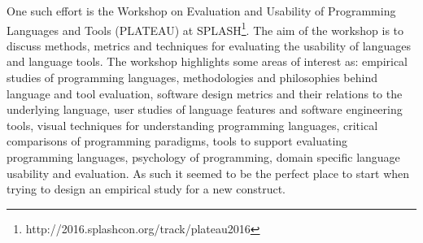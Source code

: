 One such effort is the Workshop on Evaluation and Usability of Programming Languages and Tools (PLATEAU) at SPLASH\footnote{http://2016.splashcon.org/track/plateau2016}. The aim of the workshop is to discuss methods, metrics and techniques for evaluating the usability of languages and language tools. The workshop highlights some areas of interest as: empirical studies of programming languages, methodologies and philosophies behind language and tool evaluation, software design metrics and their relations to the underlying language, user studies of language features and software engineering tools, visual techniques for understanding programming languages, critical comparisons of programming paradigms, tools to support evaluating programming languages, psychology of programming, domain specific language usability and evaluation.
As such it seemed to be the perfect place to start when trying to design an empirical study for a new construct. 



				
			
		
					
				
			
		



